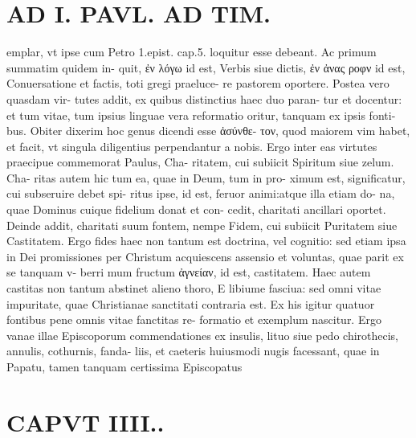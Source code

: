 \documentclass{article}
\begin{document}
\begin{pages}
\section*{AD I. PAVL. AD TIM. }
\marginpar{[ p.250 ]}\pstart emplar, vt ipse cum Petro 1.epist. cap.5. loquitur esse debeant. Ac primum summatim quidem in- quit, ἐν λόγω id est, Verbis siue dictis, ἐν ἀνας ροφν id est, Conuersatione et factis, toti gregi praeluce- re pastorem oportere. Postea vero quasdam vir- tutes addit, ex quibus distinctius haec duo paran- tur et docentur: et tum vitae, tum ipsius linguae vera reformatio oritur, tanquam ex ipsis fonti- bus. Obiter dixerim hoc genus dicendi esse ἀσύνθε- τον, quod maiorem vim habet, et facit, vt singula diligentius perpendantur a nobis. Ergo inter eas virtutes praecipue commemorat Paulus, Cha- ritatem, cui subiicit Spiritum siue zelum. Cha- ritas autem hic tum ea, quae in Deum, tum in pro- ximum est, significatur, cui subseruire debet spi- ritus ipse, id est, feruor animi:atque illa etiam do- na, quae Dominus cuique fidelium donat et con- cedit, charitati ancillari oportet. Deinde addit, charitati suum fontem, nempe Fidem, cui subiicit Puritatem siue Castitatem. Ergo fides haec non tantum est doctrina, vel cognitio: sed etiam ipsa in Dei promissiones per Christum acquiescens assensio et voluntas, quae parit ex se tanquam v- berri mum fructum ἀγνείαν, id est, castitatem. Haec autem castitas non tantum abstinet alieno thoro, E libiume fasciua: sed omni vitae impuritate, quae Christianae sanctitati contraria est. Ex his igitur quatuor fontibus pene omnis vitae fanctitas re- formatio et exemplum nascitur. Ergo vanae illae Episcoporum commendationes ex insulis, lituo siue pedo chirothecis, annulis, cothurnis, fanda- liis, et caeteris huiusmodi nugis facessant, quae in Papatu, tamen tanquam certissima Episcopatus  \pend
\section*{CAPVT  IIII.. }
\marginpar{[ p.231 ]}\pstart {}
{}

\end{pages}
\end{document}
